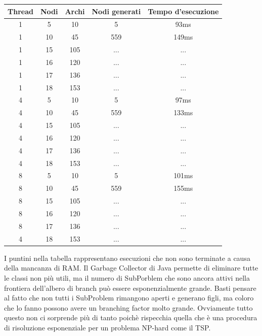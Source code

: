 \documentclass[
	article,			%
	12pt,				%
	oneside,			%
	a4paper,			%
	english,			%
	italian,				%
	sumario=tradicional,
	]{abntex2}
\begin{document}
\begin{center}
 \begin{tabular}{||c c c c c||} 
 \hline
 Thread & Nodi & Archi & Nodi generati & Tempo d'esecuzione\\ [0.5ex] 
 \hline\hline
 1 & 5 & 10 & 5 & 93ms\\ 
 \hline
 1 & 10 & 45 & 559 & 149ms\\
 \hline
 1 & 15 & 105 & ... & ...\\
 \hline
 1 & 16 & 120 & ... & ...\\
 \hline
 1 & 17 & 136 & ... & ...\\
 \hline
 1 & 18 & 153 & ... & ...\\
 \hline
 \hline
 4 & 5 & 10 & 5 & 97ms\\ 
 \hline
 4 & 10 & 45 & 559 & 133ms\\
 \hline
 4 & 15 & 105 & ... & ...\\
 \hline
 4 & 16 & 120 & ... & ...\\
 \hline
 4 & 17 & 136 & ... & ...\\
 \hline
 4 & 18 & 153 & ... & ...\\
 \hline
 \hline
 8 & 5 & 10 & 5 & 101ms\\ 
 \hline
 8 & 10 & 45 & 559 & 155ms\\
 \hline
 8 & 15 & 105 & ... & ...\\
 \hline
 8 & 16 & 120 & ... & ...\\
 \hline
 8 & 17 & 136 & ... & ...\\
 \hline
 4 & 18 & 153 & ... & ...\\
 \hline
\end{tabular}
\end{center}
I puntini nella tabella rappresentano esecuzioni che non sono terminate a causa della mancanza di RAM. Il {\selectfont Garbage Collector} di Java permette di eliminare tutte le classi non più utili, ma il numero di {\selectfont SubPorblem} che sono ancora attivi nella frontiera dell'albero di branch può essere esponenzialmente grande. Basti pensare al fatto che non tutti i {\selectfont SubProblem} rimangono aperti e generano figli, ma coloro che lo fanno possono avere un branching factor molto grande.
Ovviamente tutto questo non ci sorprende più di tanto poichè rispecchia quella che è una procedura di risoluzione esponenziale per un problema NP-hard come il TSP.
\newpage
\end{document}
